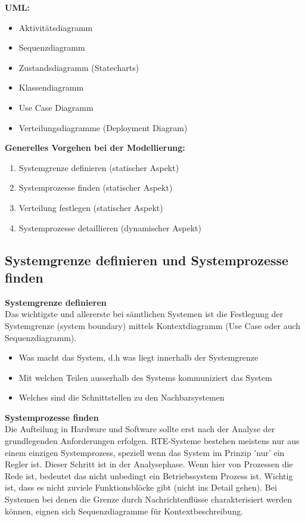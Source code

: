 \begin{multicols}{2}
	\textbf{UML:}
	\begin{itemize}
		\item Aktivitätsdiagramm
		\item Sequenzdiagramm
		\item Zustandsdiagramm (Statecharts)
		\item Klassendiagramm
		\item Use Case Diagramm
		\item Verteilungsdiagramme (Deployment Diagram)
	\end{itemize}
	\columnbreak
	
	\textbf{Generelles Vorgehen bei der Modellierung:}\\
	\begin{enumerate}
		\item Systemgrenze definieren (statischer Aspekt)
		\item Systemprozesse finden (statischer Aspekt)
		\item Verteilung festlegen (statischer Aspekt)
		\item Systemprozesse detaillieren (dynamischer Aspekt)
	\end{enumerate}
\end{multicols}

\subsection{Systemgrenze definieren und Systemprozesse finden}
\textbf{Systemgrenze definieren}\\
Das wichtigste und allererste bei sämtlichen Systemen ist die Festlegung der Systemgrenze (system boundary) mittels Kontextdiagramm (Use Case oder auch Sequenzdiagramm).
\begin{itemize}
	\item Was macht das System, d.h was liegt innerhalb der Systemgrenze
	\item Mit welchen Teilen ausserhalb des Systems kommuniziert das System
	\item Welches sind die Schnittstellen zu den Nachbarsystemen
\end{itemize}

\textbf{Systemprozesse finden}\\
Die Aufteilung in Hardware und Software sollte erst nach der Analyse der grundlegenden Anforderungen erfolgen.
RTE-Systeme bestehen meistens nur aus einem einzigen Systemprozess, speziell wenn das System im Prinzip 'nur' ein
Regler ist. Dieser Schritt ist in der Analysephase. Wenn hier von Prozessen die Rede ist, bedeutet das nicht unbedingt ein
Betriebssystem Prozess ist. Wichtig ist, dass es nicht zuviele Funktionsblöcke gibt (nicht ins Detail gehen). \newline\newline
Bei Systemen bei denen die Grenze durch Nachrichtenflüsse charakterisiert werden können, eignen sich Sequenzdiagramme
für Kontextbeschreibung.\\

